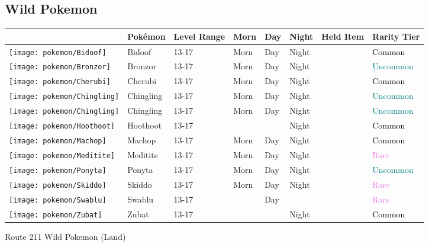 \subsection{Wild Pokemon}%
\label{subsec:WildPokemon}%
\begin{longtable}{||l l l l l l l l||}%
\hline%
&Pokémon&Level Range&Morn&Day&Night&Held Item&Rarity Tier\\%
\hline%
\endhead%
\hline%
\texttt{[image: pokemon/Bidoof]}&Bidoof&13{-}17&Morn&Day&Night&&\textcolor{black}{%
Common%
}\\%
\hline%
\texttt{[image: pokemon/Bronzor]}&Bronzor&13{-}17&Morn&Day&Night&&\textcolor{teal}{%
Uncommon%
}\\%
\hline%
\texttt{[image: pokemon/Cherubi]}&Cherubi&13{-}17&Morn&Day&Night&&\textcolor{black}{%
Common%
}\\%
\hline%
\texttt{[image: pokemon/Chingling]}&Chingling&13{-}17&Morn&Day&Night&&\textcolor{teal}{%
Uncommon%
}\\%
\hline%
\texttt{[image: pokemon/Chingling]}&Chingling&13{-}17&Morn&Day&Night&&\textcolor{teal}{%
Uncommon%
}\\%
\hline%
\texttt{[image: pokemon/Hoothoot]}&Hoothoot&13{-}17&&&Night&&\textcolor{black}{%
Common%
}\\%
\hline%
\texttt{[image: pokemon/Machop]}&Machop&13{-}17&Morn&Day&Night&&\textcolor{black}{%
Common%
}\\%
\hline%
\texttt{[image: pokemon/Meditite]}&Meditite&13{-}17&Morn&Day&Night&&\textcolor{violet}{%
Rare%
}\\%
\hline%
\texttt{[image: pokemon/Ponyta]}&Ponyta&13{-}17&Morn&Day&Night&&\textcolor{teal}{%
Uncommon%
}\\%
\hline%
\texttt{[image: pokemon/Skiddo]}&Skiddo&13{-}17&Morn&Day&Night&&\textcolor{violet}{%
Rare%
}\\%
\hline%
\texttt{[image: pokemon/Swablu]}&Swablu&13{-}17&&Day&&&\textcolor{violet}{%
Rare%
}\\%
\hline%
\texttt{[image: pokemon/Zubat]}&Zubat&13{-}17&&&Night&&\textcolor{black}{%
Common%
}\\%
\hline%
\end{longtable}%
\caption{Route 211 Wild Pokemon (Land)}